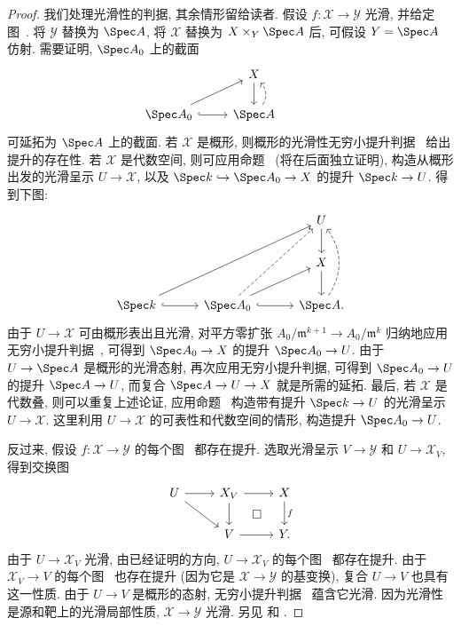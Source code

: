 \begin{proof}
我们处理光滑性的判据, 其余情形留给读者. 假设 $f:\mathcal X\to\mathcal Y$ 光滑, 并给定图~. 将 $\mathcal Y$ 替换为 $\Spec A$, 将 $\mathcal X$ 替换为 $\mathcal X\times_{\mathcal Y}\Spec A$ 后, 可假设 $\mathcal Y=\Spec A$ 仿射. 需要证明, $\Spec A_0$ 上的截面
\[
\begin{tikzcd}
{}&\mathcal X\arrow[d]&{}\\
\Spec A_0\arrow[r,hook]\arrow[ur]&\Spec A\arrow[u,dashed,bend right=40]&{}
\end{tikzcd}
\]
可延拓为 $\Spec A$ 上的截面. 若 $\mathcal X$ 是概形, 则概形的光滑性无穷小提升判据~ 给出提升的存在性. 若 $\mathcal X$ 是代数空间, 则可应用命题~ (将在后面独立证明), 构造从概形出发的光滑呈示 $U\to\mathcal X$, 以及 $\Spec k\hookrightarrow\Spec A_0\to\mathcal X$ 的提升 $\Spec k\to U$. 得到下图:
\[
\begin{tikzcd}[column sep=3em,row sep=2em]
{}&{}&U\arrow[d]\\
{}&{}&\mathcal X\arrow[d]\\
\Spec k\arrow[r,hook]\arrow[uurr]&\Spec A_0\arrow[r,hook]\arrow[ur]\arrow[uur,dashed]&\Spec A\arrow[uu,dashed,bend right=35].
\end{tikzcd}
\]
由于 $U\to\mathcal X$ 可由概形表出且光滑, 对平方零扩张 $A_0/\mathfrak m^{k+1}\to A_0/\mathfrak m^k$ 归纳地应用无穷小提升判据~, 可得到 $\Spec A_0\to\mathcal X$ 的提升 $\Spec A_0\to U$. 由于 $U\to\Spec A$ 是概形的光滑态射, 再次应用无穷小提升判据, 可得到 $\Spec A_0\to U$ 的提升 $\Spec A\to U$, 而复合 $\Spec A\to U\to\mathcal X$ 就是所需的延拓. 最后, 若 $\mathcal X$ 是代数叠, 则可以重复上述论证, 应用命题~ 构造带有提升 $\Spec k\to U$ 的光滑呈示 $U\to\mathcal X$. 这里利用 $U\to\mathcal X$ 的可表性和代数空间的情形, 构造提升 $\Spec A_0\to U$.

反过来, 假设 $f:\mathcal X\to\mathcal Y$ 的每个图~ 都存在提升. 选取光滑呈示 $V\to\mathcal Y$ 和 $U\to\mathcal X_V$, 得到交换图
\[
\begin{tikzcd}
U\arrow[r]\arrow[dr]&\mathcal X_V\arrow[r]\arrow[d]&\mathcal X\arrow[d,"f"]\\
{}&V\arrow[r]\arrow[ur,phantom,"\square" description]&\mathcal Y.
\end{tikzcd}
\]
由于 $U\to\mathcal X_V$ 光滑, 由已经证明的方向, $U\to\mathcal X_V$ 的每个图~ 都存在提升. 由于 $\mathcal X_V\to V$ 的每个图~ 也存在提升 (因为它是 $\mathcal X\to\mathcal Y$ 的基变换), 复合 $U\to V$ 也具有这一性质. 由于 $U\to V$ 是概形的态射, 无穷小提升判据~ 蕴含它光滑. 因为光滑性是源和靶上的光滑局部性质, $\mathcal X\to\mathcal Y$ 光滑. 另见 \cite[命题 $4.15$]{LMB00} 和 \cite[Tag 0DP0]{SP}.
\end{proof}
